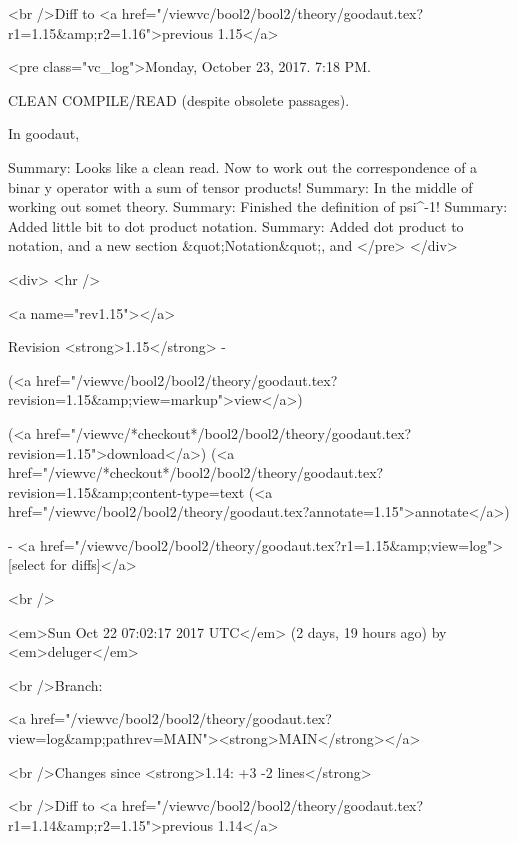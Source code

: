 <br />Diff to <a href="/viewvc/bool2/bool2/theory/goodaut.tex?r1=1.15&amp;r2=1.16">previous 1.15</a>










<pre class="vc_log">Monday, October 23, 2017.  7:18 PM.

CLEAN COMPILE/READ (despite obsolete passages).

In goodaut,

Summary: Looks like a clean read.  Now to work out the correspondence of a binar
y operator with a sum of tensor products!
Summary: In the middle of working out somet theory.
Summary: Finished the definition of psi^{-1}!
Summary: Added little bit to dot product notation.
Summary: Added dot product to notation, and a new section &quot;Notation&quot;, and
</pre>
</div>



<div>
<hr />

<a name="rev1.15"></a>


Revision <strong>1.15</strong> -


(<a href="/viewvc/bool2/bool2/theory/goodaut.tex?revision=1.15&amp;view=markup">view</a>)


(<a href="/viewvc/*checkout*/bool2/bool2/theory/goodaut.tex?revision=1.15">download</a>)
(<a href="/viewvc/*checkout*/bool2/bool2/theory/goodaut.tex?revision=1.15&amp;content-type=text%
(<a href="/viewvc/bool2/bool2/theory/goodaut.tex?annotate=1.15">annotate</a>)



- <a href="/viewvc/bool2/bool2/theory/goodaut.tex?r1=1.15&amp;view=log">[select for diffs]</a>




<br />

<em>Sun Oct 22 07:02:17 2017 UTC</em>
(2 days, 19 hours ago)
by <em>deluger</em>


<br />Branch:

<a href="/viewvc/bool2/bool2/theory/goodaut.tex?view=log&amp;pathrev=MAIN"><strong>MAIN</strong></a>







<br />Changes since <strong>1.14: +3 -2 lines</strong>








<br />Diff to <a href="/viewvc/bool2/bool2/theory/goodaut.tex?r1=1.14&amp;r2=1.15">previous 1.14</a>










